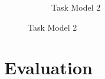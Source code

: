 \documentclass[5pt]{article} %
\begin{document}
\begin{figure}[h]
\begin{subfigure}{.5\textwidth}
\caption{Task Model 2}
\end{subfigure}
\end{figure}

\clearpage
\section{Evaluation}
\end{document}
